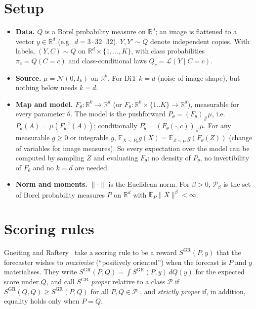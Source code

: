 \documentclass[11pt]{article}
\theoremstyle{definition}
\theoremstyle{remark}
\newcommand{\R}{\mathbb{R}}
\newcommand{\E}{\mathbb{E}}
\newcommand{\Pb}{\mathcal{P}}
\newcommand{\N}{\mathcal{N}}
\newcommand{\norm}[1]{\lVert #1\rVert}
\begin{document}
\section{Setup}\label{sec:setup}
\begin{itemize}
\item \textbf{Data.} $Q$ is a Borel probability measure on $\R^d$; an image is flattened to a vector
$y\in\R^d$ (e.g.\ $d=3\cdot 32\cdot 32$). $Y,Y'\sim Q$ denote independent copies. With labels,
$(Y,C)\sim Q$ on $\R^d\times\{1,\dots,K\}$, with class probabilities $\pi_c=Q(C=c)$ and class-conditional
laws $Q_c=\mathcal L(Y\mid C=c)$.
\item \textbf{Source.} $\mu=\N(0,I_k)$ on $\R^k$. For DiT $k=d$ (noise of image shape), but nothing below
needs $k=d$.
\item \textbf{Map and model.} $F_\theta:\R^k\to\R^d$ (or $F_\theta:\R^k\times\{1..K\}\to\R^d$),
measurable for every parameter $\theta$. The model is the pushforward $P_\theta=(F_\theta)_\#\mu$, i.e.\
$P_\theta(A)=\mu(F_\theta^{-1}(A))$; conditionally $P^c_\theta=(F_\theta(\cdot,c))_\#\mu$.
For any measurable $g\ge0$ or integrable $g$, $\E_{X\sim P_\theta}g(X)=\E_{Z\sim\mu}\,g(F_\theta(Z))$ (change of
variables for image measures). So every expectation over the model can be computed by sampling $Z$ and
evaluating $F_\theta$: no density of $P_\theta$, no invertibility of $F_\theta$ and no $k=d$ are needed.
\item \textbf{Norm and moments.} $\norm{\cdot}$ is the Euclidean norm. For $\beta>0$, $\Pb_\beta$ is the set
of Borel probability measures $P$ on $\R^d$ with $\E_P\norm{X}^\beta<\infty$.
\end{itemize}

\section{Scoring rules}\label{sec:scoring}
Gneiting and Raftery~\cite[Sec.~1--2]{GR2007} take a scoring rule to be a reward $S^{\mathrm{GR}}(P,y)$
that the forecaster wishes to \emph{maximise} (``positively oriented'') when the forecast is $P$ and $y$
materialises. They write $S^{\mathrm{GR}}(P,Q)=\int S^{\mathrm{GR}}(P,y)\,dQ(y)$ for the expected score under
$Q$, and call $S^{\mathrm{GR}}$ \emph{proper} relative to a class $\Pb$ if $S^{\mathrm{GR}}(Q,Q)\ge S^{\mathrm{GR}}(P,Q)$
for all $P,Q\in\Pb$ \cite[eq.~(1)]{GR2007}, and \emph{strictly proper} if, in addition, equality holds only when
$P=Q$.
\end{document}
